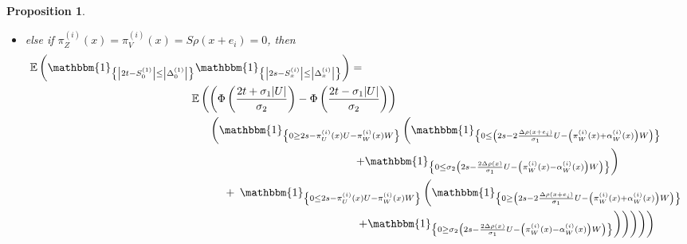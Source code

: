 \documentclass[12pt]{article}
\theoremstyle{Theorem}
\newtheorem{Proposition}[Theorem]{Proposition}
\begin{document}
\begin{Proposition}
\begin{itemize}
{\begin{align}
\end{align}}
\item else if $\pi^{\scriptscriptstyle(i)}_{Z}(x)= \pi^{\scriptscriptstyle (i)}_{V}(x) = S\rho(x+e_i) = 0$, then
{\tiny 
\begin{align*}
\mathbb{E}\left(\mathbbm{1}_{\left\{ \left|2t - S^{\scriptscriptstyle (1)}_{\scriptscriptstyle 0}\right| \leq \left|\Delta^{\scriptscriptstyle (1)}_{\scriptscriptstyle 0}\right|\right\}}\mathbbm{1}_{\left\{ \left|2s - S^{\scriptscriptstyle (i)}_{\scriptscriptstyle x}\right| \leq \left|\Delta^{\scriptscriptstyle (i)}_x\right| \right\}}\right) & = \\
& \hspace{-5cm} \mathbb{E}\left(\left(\Phi\left(\frac{2t + \sigma_{1}|U|}{\sigma_{2}}\right) - \Phi\left(\frac{2t - \sigma_{1}|U|}{\sigma_{2}} \right) \right)\right.\\
&\hspace{-4.5cm}  \left.\left(\mathbbm{1}_{\left\{ 0 \geq 2s -   \pi^{\scriptscriptstyle (i)}_{U}(x)U - \pi^{\scriptscriptstyle (i)}_{W}(x)W\right\}} \left(\mathbbm{1}_{\left\{ 0 \leq \left(2s - 2\frac{\Delta\rho(x+e_i)}{\sigma_1}U -  \left(\pi^{\scriptscriptstyle (i)}_{W}(x) + \alpha^{\scriptscriptstyle (i)}_{W}(x)\right)W\right) \right\}}\right.\right.\right.\\
& \left.\left. \left. + \mathbbm{1}_{\left\{ 0 \leq \sigma_{2}\left(2s -\frac{2\Delta\rho(x)}{\sigma_1}U - \left(\pi^{\scriptscriptstyle (i)}_{W}(x) - \alpha^{\scriptscriptstyle (i)}_{W}(x)\right)W\right)\right\}}\right)\right.\right.\\
& \hspace{-4cm}+ \left.\left. \mathbbm{1}_{\left\{ 0 \leq 2s -   \pi^{\scriptscriptstyle (i)}_{U}(x)U - \pi^{\scriptscriptstyle (i)}_{W}(x)W\right\}} \left(\mathbbm{1}_{\left\{ 0 \geq \left(2s - 2\frac{\Delta\rho(x+e_i)}{\sigma_1}U -  \left(\pi^{\scriptscriptstyle (i)}_{W}(x) + \alpha^{\scriptscriptstyle (i)}_{W}(x)\right)W\right) \right\}}\right.\right.\right.\\
& \left.\left.\left. \left. \left. + \mathbbm{1}_{\left\{ 0 \geq \sigma_{2}\left(2s -\frac{2\Delta\rho(x)}{\sigma_1}U - \left(\pi^{\scriptscriptstyle (i)}_{W}(x) - \alpha^{\scriptscriptstyle (i)}_{W}(x)\right)W\right)\right\}}\right)\right)\right)\right)\right)
\end{align*}
}
\end{itemize}
\end{Proposition}
\end{document}
